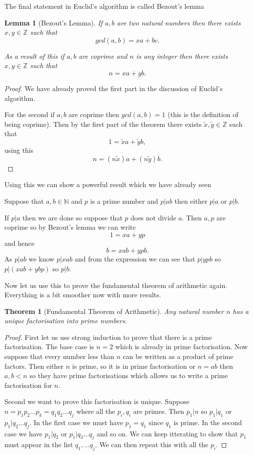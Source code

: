 \documentclass[
]{book}
\newtheorem{theorem}{Theorem}[chapter]
\newtheorem{lemma}{Lemma}[chapter]
\theoremstyle{definition}
\theoremstyle{definition}
\theoremstyle{definition}
\theoremstyle{definition}
\theoremstyle{remark}
\begin{document}
The final statement in Euclid's algorithm is called Bezout's lemma

\begin{lemma}[Bezout's Lemma]
If \(a,b\) are two natural numbers then there exists \(x,y \in \mathbb{Z}\) such that
\[ gcd(a,b) = x a + b c.  \]

As a result of this if \(a,b\) are coprime and \(n\) is any integer then there exists \(x, y \in \mathbb{Z}\) such that
\[ n = xa + yb.\]
\end{lemma}

\begin{proof}
We have already proved the first part in the discussion of Euclid's algorithm.

For the second if \(a,b\) are coprime then \(gcd(a,b) =1\) (this is the definition of being coprime). Then by the first part of the theorem there exists \(\tilde{x}, \tilde{y} \in \mathbb{Z}\) such that
\[ 1= \tilde{x}a + \tilde{y}b,  \] using this
\[ n = (n\tilde{x})a + (n \tilde{y})b.  \]
\end{proof}

Using this we can show a powerful result which we have already seen

Suppose that \(a,b \in \mathbb{N}\) and \(p\) is a prime number and \(p|ab\) then either \(p|a\) or \(p|b\).

If \(p|a\) then we are done so suppose that \(p\) does not divide \(a\). Then \(a,p\) are coprime so by Bezout's lemma we can write
\[1 = xa + yp\] and hence
\[b = xab + ypb.  \] As \(p|ab\) we know \(p|xab\) and from the expression we can see that \(p|ypb\) so \(p | (xab + ybp)\) so \(p|b\).

Now let us use this to prove the fundamental theorem of arithmetic again. Everything is a bit smoother now with more results.

\begin{theorem}[Fundamental Theorem of Arithmetic]
Any natural number \(n\) has a unique factorisation into prime numbers.
\end{theorem}

\begin{proof}
First let us use strong induction to prove that there is a prime factorisation. The base case is \(n=2\) which is already in prime factorisation. Now suppose that every number less than \(n\) can be written as a product of prime factors. Then either \(n\) is prime, so it is in prime factorisation or \(n=ab\) then \(a,b < n\) so they have prime factorisations which allows us to write a prime factorisation for \(n\).

Second we want to prove this factorisation is unique. Suppose \(n = p_1 p_2 \dots p_k = q_1 q_2 \dots q_j\) where all the \(p_i, q_i\) are primes. Then \(p_1 | n\) so \(p_1|q_1\) or \(p_1 |q_2\dots q_j\). In the first case we must have \(p_1=q_1\) since \(q_1\) is prime. In the second case we have \(p_1|q_2\) or \(p_1 |q_3 \dots q_j\) and so on. We can keep itterating to show that \(p_1\) must appear in the list \(q_1, \dots q_j\). We can then repeat this with all the \(p_i\).
\end{proof}
\end{document}
